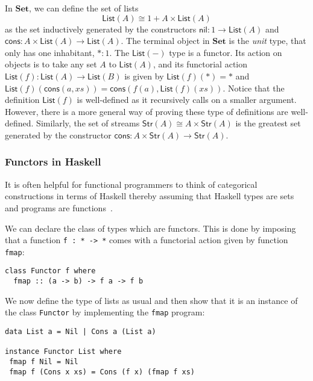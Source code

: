 \documentclass{llncs}
\newcommand{\operator}[1]{\textsf{#1}}
\newcommand{\Set}{\mathbf{Set}}
\newcommand{\iso}{\cong}
\newcommand{\Str}[1]{\operator{Str}(#1)}
\newcommand{\List}[1]{\operator{List}(#1)}
\newcommand{\nil}{\operator{nil}}
\newcommand{\cons}{\operator{cons}}
\begin{document}
In $\Set$, we can define the set of lists
\[
  \List{A} \iso 1 + A \times \List{A}
\]
as the set inductively generated by the
constructors $\nil : 1 \to \List{A}$ and
$\cons : A \times \List{A} \to \List{A}$.
The terminal object in $\Set$ is the \emph{unit} type, that only has one
inhabitant, $* : 1$.
The $\List{-}$ type is a functor. Its action on objects is to take any set
$A$ to $\List{A}$, and its functorial
action $\List{f} : \List{A} \to \List{B}$ is given by $\List{f}(*) = *$ and
$\List{f}(\cons(a,xs)) = \cons(f(a), \List{f}(xs))$. Notice that the definition
$\List{f}$ is well-defined as it recursively calls on a smaller argument.
However, there is a more general way of proving these type of definitions are
well-defined. Similarly, the set of streams $\Str{A} \iso A \times \Str{A}$ is
the greatest set generated by the constructor
$\cons : A \times \Str{A} \to \Str{A}$.

\subsubsection{Functors in Haskell}
It is often helpful for functional programmers to think of categorical
constructions in terms of Haskell thereby assuming that Haskell types are sets
and programs are functions~\cite{DanielssonHJG06}.

We can declare the class of types which are functors. This is done by imposing
that a function \texttt{f : * -> *} comes with a functorial action
given by function \texttt{fmap}:
\begin{verbatim}
class Functor f where
  fmap :: (a -> b) -> f a -> f b
\end{verbatim}

We now define the type of lists as usual and then show that it is an instance of the class \texttt{Functor} by implementing the \texttt{fmap} program:
\begin{verbatim}
data List a = Nil | Cons a (List a)

instance Functor List where
 fmap f Nil = Nil
 fmap f (Cons x xs) = Cons (f x) (fmap f xs)
\end{verbatim}
\end{document}
